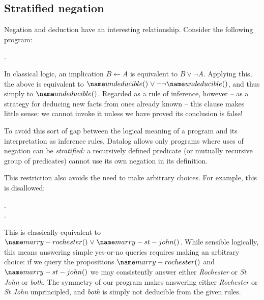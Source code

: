 

\subsection{Stratified negation}
\label{section-stratified-negation}

Negation and deduction have an interesting relationship.
%
Consider the following program:

\begin{datalog}
   \gets \neg {}.
\end{datalog}

\noindent
In classical logic, an implication $B \gets A$ is equivalent to $B \vee \neg A$.
Applying this, the above is equivalent to $\atom{undeducible}{} \vee
\neg\neg\atom{undeducible}{}$, and thus simply to $\atom{undeducible}{}$.
%
Regarded as a rule of inference, however -- as a strategy for deducing new facts
from ones already known -- this clause makes little sense: we cannot invoke it
unless we have proved its conclusion is false!

To avoid this sort of gap between the logical meaning of a program and its
interpretation as inference rules, Datalog allows only programs where uses of
negation can be \emph{stratified:} a recursively defined predicate (or mutually
recursive group of predicates) cannot use its own negation in its definition.

This restriction also avoids the need to make arbitrary choices. For example,
this is disallowed:

\begin{datalog}
   \gets \neg {}.\\
   \gets \neg {}.
\end{datalog}

\noindent
This is classically equivalent to $\atom{marry-rochester}{} \vee
\atom{marry-st-john}{}$. While sensible logically, this means answering simple
yes-or-no queries requires making an arbitrary choice: if we query the
propositions $\atom{marry-rochester}{}$ and $\atom{marry-st-john}{}$ we
may consistently answer either \emph{Rochester} or \emph{St John} or
\emph{both}.
%
The symmetry of our program makes answering either
\emph{Rochester} or \emph{St John} unprincipled, and \emph{both} is simply
not deducible from the given rules.%
%


